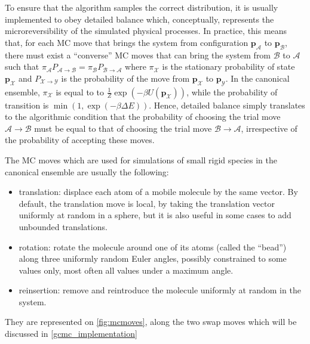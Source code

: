 \documentclass[main.tex]{subfiles}
\begin{document}
To ensure that the algorithm samples the correct distribution, it is usually implemented to obey detailed balance which, conceptually, represents the microreversibility of the simulated physical processes. In practice, this means that, for each MC move that brings the system from configuration ${\boldsymbol p}_\mathcal{A}$ to ${\boldsymbol p}_\mathcal{B}$, there must exist a ``converse'' MC moves that can bring the system from $\mathcal{B}$ to $\mathcal{A}$ such that $\pi_\mathcal{A} P_{\mathcal{A}\to \mathcal{B}} = \pi_\mathcal{B} P_{\mathcal{B}\to \mathcal{A}}$ where $\pi_\mathcal{X}$ is the stationary probability of state ${\boldsymbol p}_\mathcal{X}$ and $P_{\mathcal{X}\to \mathcal{Y}}$ is the probability of the move from ${\boldsymbol p}_\mathcal{X}$ to ${\boldsymbol p}_\mathcal{Y}$. In the canonical ensemble, $\pi_\mathcal{X}$ is equal to to $\frac1Z\exp\left(-\beta U\left({\boldsymbol p}_\mathcal{X}\right)\right)$, while the probability of transition is $\min\left(1, \exp\left(-\beta \Delta E\right)\right)$. Hence, detailed balance simply translates to the algorithmic condition that the probability of choosing the trial move $\mathcal{A}\to \mathcal{B}$ must be equal to that of choosing the trial move $\mathcal{B}\to \mathcal{A}$, irrespective of the probability of accepting these moves.

The MC moves which are used for simulations of small rigid species in the canonical ensemble are usually the following:
\begin{itemize}
    \item translation: displace each atom of a mobile molecule by the same vector. By default, the translation move is local, by taking the translation vector uniformly at random in a sphere, but it is also useful in some cases to add unbounded translations.
    \item rotation: rotate the molecule around one of its atoms (called the ``bead'') along three uniformly random Euler angles, possibly constrained to some values only, most often all values under a maximum angle.
    \item reinsertion: remove and reintroduce the molecule uniformly at random in the system.
\end{itemize}
They are represented on \cref{fig:mcmoves}, along the two swap moves which will be discussed in \cref{gcmc_implementation}
\end{document}

